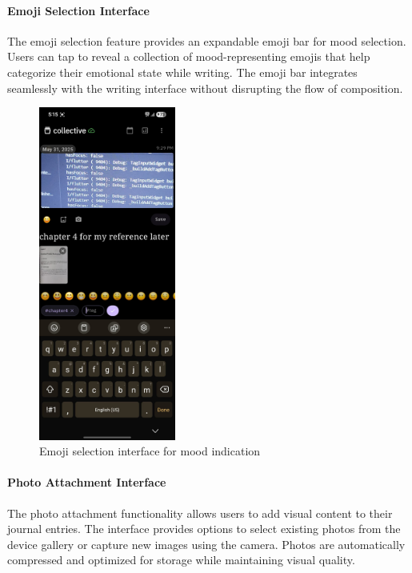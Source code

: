 \paragraph{Emoji Selection Interface}

The emoji selection feature provides an expandable emoji bar for mood selection. Users can tap to reveal a collection of mood-representing emojis that help categorize their emotional state while writing. The emoji bar integrates seamlessly with the writing interface without disrupting the flow of composition.

\begin{figure}[H]
\centering
\includegraphics[width=0.4\textwidth]{files/imgs/prototype/emoji_selection.jpeg}
\caption{Emoji selection interface for mood indication}
\label{fig:emoji-selection}
\end{figure}

\paragraph{Photo Attachment Interface}

The photo attachment functionality allows users to add visual content to their journal entries. The interface provides options to select existing photos from the device gallery or capture new images using the camera. Photos are automatically compressed and optimized for storage while maintaining visual quality.

